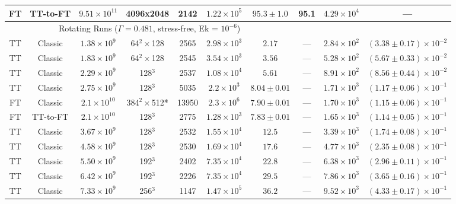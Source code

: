 \documentclass[aps, pre, onecolumn, nofootinbib, notitlepage, groupedaddress, amsfonts, amssymb, amsmath, longbibliography, superscriptaddress]{revtex4-1}
\begin{document}
\begin{table}[ht]
\begin{center}
{\begin{tabular}{c c c c c c c c c c}
FT			&	TT-to-FT	&	$9.51 \times 10^{11}$	&	4096x2048	&	2142		&	$1.22 \times 10^5$	& 	$95.3 \pm 1.0$ 	&	95.1	&	$4.29 \times 10^4$ & --- \\
\hline																	
\multicolumn{7}{c}{\vspace{0.1cm}Rotating Runs ($\Gamma = 0.481$, stress-free, Ek = $10^{-6}$)} \\
\hline																	
TT	&	Classic		&	$1.38 \times 10^9$		&	64$^2\times$128 	&	2565		&	$2.98 \times 10^3$	&	$2.17$			&	---		&	$2.84 \times 10^2$  & $(3.38 \pm 0.17) \times 10^{-2}$ \\
TT	&	Classic		&	$1.83 \times 10^9$		&	64$^2\times$128 	&	2545		&	$3.54 \times 10^3$	&	$3.56$			&	---		&	$5.28 \times 10^2$  & $(5.67 \pm 0.33) \times 10^{-2}$ \\
TT	&	Classic		&	$2.29 \times 10^9$		&	128$^3$				&	2537		&	$1.08 \times 10^4$	&	$5.61$			&	---		&	$8.91 \times 10^2$  & $(8.56 \pm 0.44) \times 10^{-2}$ \\
TT	&	Classic		&	$2.75 \times 10^9$		&	128$^3$				&	5035		&	$2.2 \times 10^3$	&	$8.04 \pm 0.01$	&	---		&	$1.71 \times 10^3$  & $(1.17 \pm 0.06) \times 10^{-1}$ \\
FT	&	Classic		&	$2.1 \times 10^{10}$	&	384$^2\times$512*	&	13950		&	$2.3 \times 10^6$	&	$7.90 \pm 0.01$	&	---		&	$1.70 \times 10^3$  & $(1.15 \pm 0.06) \times 10^{-1}$ \\
FT	&	TT-to-FT	&	$2.1 \times 10^{10}$	&	128$^3$				&	2775		&	$1.28 \times 10^3$	&	$7.83 \pm 0.01$	&	---		&	$1.65 \times 10^3$  & $(1.14 \pm 0.05) \times 10^{-1}$ \\
TT	&	Classic		&	$3.67 \times 10^9$		&	128$^3$				&	2532		&	$1.55 \times 10^4$	&	$12.5$			&	---		&	$3.39 \times 10^3$  & $(1.74 \pm 0.08) \times 10^{-1}$ \\
TT	&	Classic		&	$4.58 \times 10^9$		&	128$^3$				&	2530		&	$1.69 \times 10^4$	&	$17.6$			&	---		&	$4.77 \times 10^3$  & $(2.35 \pm 0.08) \times 10^{-1}$ \\
TT	&	Classic		&	$5.50 \times 10^9$		&	192$^3$				&	2402		&	$7.35 \times 10^4$	&	$22.8$			&	---		&	$6.38 \times 10^3$  & $(2.96 \pm 0.11) \times 10^{-1}$ \\
TT	&	Classic		&	$6.42 \times 10^9$		&	192$^3$				&	2226		&	$7.35 \times 10^4$	&	$29.5$			&	---		&	$7.86 \times 10^3$  & $(3.65 \pm 0.16) \times 10^{-1}$ \\
TT	&	Classic		&	$7.33 \times 10^9$		&	256$^3$				&	1147		&	$1.47 \times 10^5$	&	$36.2$			&	---		&	$9.52 \times 10^3$  & $(4.33 \pm 0.17) \times 10^{-1}$ \\

\end{tabular}}
\end{center}
\end{table}
\end{document}
